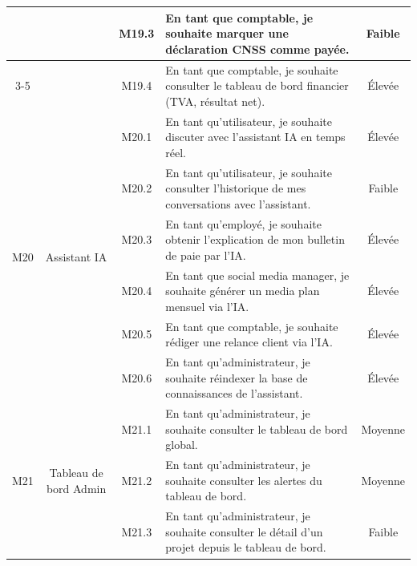 \begin{longtable}{|c|c|c|p{7.2cm}|c|}
 & & M19.3 & En tant que comptable, je souhaite marquer une déclaration CNSS comme payée. & Faible \\
\cline{3-5}
 & & M19.4 & En tant que comptable, je souhaite consulter le tableau de bord financier (TVA, résultat net). & Élevée \\
\hline
\multirow{6}{*}{M20} & \multirow{6}{*}{Assistant IA} & M20.1 & En tant qu'utilisateur, je souhaite discuter avec l'assistant IA en temps réel. & Élevée \\
\cline{3-5}
 & & M20.2 & En tant qu'utilisateur, je souhaite consulter l'historique de mes conversations avec l'assistant. & Faible \\
\cline{3-5}
 & & M20.3 & En tant qu'employé, je souhaite obtenir l'explication de mon bulletin de paie par l'IA. & Élevée \\
\cline{3-5}
 & & M20.4 & En tant que social media manager, je souhaite générer un media plan mensuel via l'IA. & Élevée \\
\cline{3-5}
 & & M20.5 & En tant que comptable, je souhaite rédiger une relance client via l'IA. & Élevée \\
\cline{3-5}
 & & M20.6 & En tant qu'administrateur, je souhaite réindexer la base de connaissances de l'assistant. & Élevée \\
\hline
\multirow{3}{*}{M21} & \multirow{3}{*}{Tableau de bord Admin} & M21.1 & En tant qu'administrateur, je souhaite consulter le tableau de bord global. & Moyenne \\
\cline{3-5}
 & & M21.2 & En tant qu'administrateur, je souhaite consulter les alertes du tableau de bord. & Moyenne \\
\cline{3-5}
 & & M21.3 & En tant qu'administrateur, je souhaite consulter le détail d'un projet depuis le tableau de bord. & Faible \\
\hline
\end{longtable}